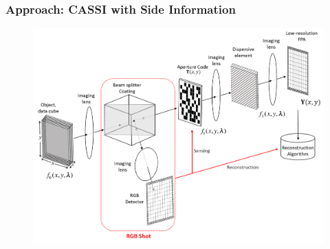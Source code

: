\documentclass{beamer}
\begin{document}
\begin{frame}
\frametitle{Approach: CASSI with Side Information}

\vspace{-10pt}
\begin{figure}
\includegraphics[scale=0.4]{FiguresUpd/system.png}
\end{figure}

\end{frame}

\end{document}
